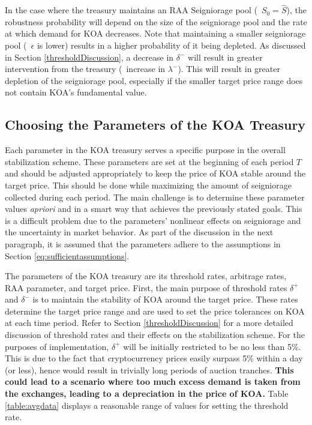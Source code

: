 In the case where the treasury maintains an RAA Seigniorage pool (\ie\ $S_0 = \hat{S}$), the robustness probability will depend on the size of the seigniorage pool and the rate at which demand for KOA decreases. Note that maintaining a smaller seigniorage pool (\ie\ $\epsilon$ is lower) results in a higher probability of it being depleted. As discussed in Section \ref{thresholdDiscussion}, a decrease in $\delta^-$ will result in greater intervention from the treasury (\ie\ increase in $\lambda^-$). This will result in greater depletion of the seigniorage pool, especially if the smaller target price range does not contain KOA's fundamental value. 

\subsection{Choosing the Parameters of the KOA Treasury}
Each parameter in the KOA treasury serves a specific purpose in the overall stabilization scheme. These parameters are set at the beginning of each period $T$ and should be adjusted appropriately to keep the price of KOA stable around the target price. This should be done while maximizing the amount of seigniorage collected during each period. The main challenge is to determine these parameter values \textit{apriori} and in a smart way that achieves the previously stated goals. This is a difficult problem due to the parameters' nonlinear effects on seigniorage and the uncertainty in market behavior. As part of the discussion in the next paragraph, it is assumed that the parameters adhere to the assumptions in Section \ref{eq:sufficientassumptions}.

The parameters of the KOA treasury are its threshold rates, arbitrage rates, RAA parameter, and target price. First, the main purpose of threshold rates $\delta^+$ and $\delta^-$ is to maintain the stability of KOA around the target price. These rates determine the target price range and are used to set the price tolerances on KOA at each time period. Refer to Section \ref{thresholdDiscussion} for a more detailed discussion of threshold rates and their effects on the stabilization scheme. For the purposes of implementation, $\delta^+$ will be initially restricted to be no less than 5\%. This is due to the fact that cryptocurrency prices easily surpass 5\% within a day (or less), hence would result in trivially long periods of auction tranches. \textbf{This could lead to a scenario where too much excess demand is taken from the exchanges, leading to a depreciation in the price of KOA.} Table \ref{table:avgdata} displays a reasonable range of values for setting the threshold rate.


